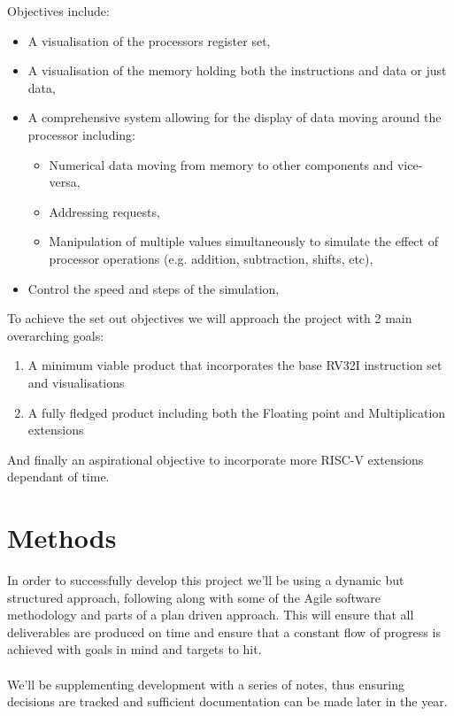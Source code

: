\documentclass[a4paper,fleqn,12pt]{article}
\begin{document}
Objectives include:
\begin{itemize}
    \item A visualisation of the processors register set,
    \item A visualisation of the memory holding both the instructions and data or just data,
    \item A comprehensive system allowing for the display of data moving around the processor including:
    \begin{itemize}
        \item Numerical data moving from memory to other components and vice-versa,
        \item Addressing requests,
        \item Manipulation of multiple values simultaneously to simulate the effect of processor operations (e.g. addition, subtraction, shifts, etc),
    \end{itemize}
    \item Control the speed and steps of the simulation,
\end{itemize}

To achieve the set out objectives we will approach the project with 2 main overarching goals:
\begin{enumerate}
    \item A minimum viable product that incorporates the base RV32I instruction set and visualisations
    \item A fully fledged product including both the Floating point and Multiplication extensions
\end{enumerate}

And finally an aspirational objective to incorporate more RISC-V extensions dependant of time.


\section{Methods}
In order to successfully develop this project we'll be using a dynamic but structured approach, following along with some of the Agile \cite{atlassian_2022_agile} software methodology and parts of a plan driven approach. This will ensure that all deliverables are produced on time and ensure that a constant flow of progress is achieved with goals in mind and targets to hit.
\\\\
We'll be supplementing development with a series of notes, thus ensuring decisions are tracked and sufficient documentation can be made later in the year.
\end{document}
